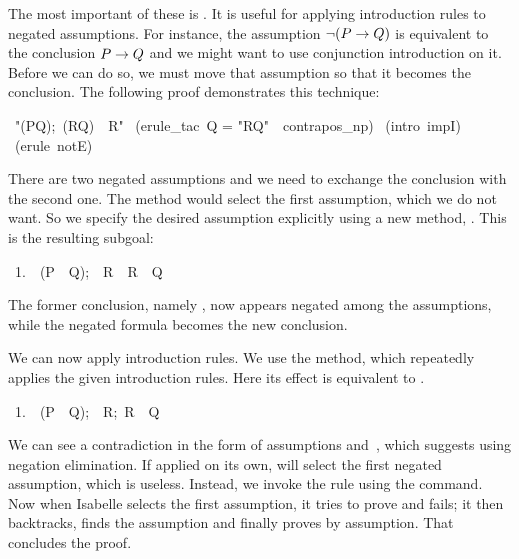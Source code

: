The most important of these is .  It is useful
for applying introduction rules to negated assumptions.  For instance, 
the assumption $\lnot(P\rightarrow Q)$ is equivalent to the conclusion $P\rightarrow Q$ and we 
might want to use conjunction introduction on it. 
Before we can do so, we must move that assumption so that it 
becomes the conclusion. The following proof demonstrates this 
technique: 
\begin{isabelle}
\ "\isasymlbrakk{\isasymnot}(P{\isasymlongrightarrow}Q);\
\isasymnot(R{\isasymlongrightarrow}Q)\isasymrbrakk\ \isasymLongrightarrow\
R"\isanewline
\isacommand{apply}\ (erule_tac\ Q = "R{\isasymlongrightarrow}Q"\ \
contrapos_np)\isanewline
{}\ (intro\ impI)\isanewline
\isacommand{by}\ (erule\ notE)
\end{isabelle}
%
There are two negated assumptions and we need to exchange the conclusion with the
second one.  The method  would select the first assumption,
which we do not want.  So we specify the desired assumption explicitly
using a new method, \isa{erule_tac}.  This is the resulting subgoal: 
\begin{isabelle}
\ 1.\ \isasymlbrakk{\isasymnot}\ (P\ \isasymlongrightarrow\ Q);\ \isasymnot\
R\isasymrbrakk\ \isasymLongrightarrow\ R\ \isasymlongrightarrow\ Q%
\end{isabelle}
The former conclusion, namely , now appears negated among the assumptions,
while the negated formula \isa{R\ \isasymlongrightarrow\ Q} becomes the new
conclusion.

We can now apply introduction rules.  We use the \methdx{intro} method, which
repeatedly applies the given introduction rules.  Here its effect is equivalent
to .
\begin{isabelle}
\ 1.\ \isasymlbrakk{\isasymnot}\ (P\ \isasymlongrightarrow\ Q);\ \isasymnot\ R;\
R\isasymrbrakk\ \isasymLongrightarrow\ Q%
\end{isabelle}
We can see a contradiction in the form of assumptions 
and~, which suggests using negation elimination.  If applied on its own,
\isa{notE} will select the first negated assumption, which is useless.  
Instead, we invoke the rule using the
\isa{by} command.
Now when Isabelle selects the first assumption, it tries to prove  and fails; it then backtracks, finds the 
assumption \isa{\isasymnot~R} and finally proves \isa{R} by assumption.  That
concludes the proof.

